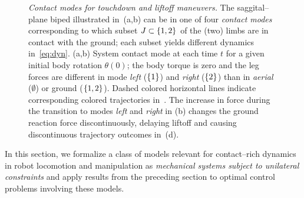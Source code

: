 \documentclass{article}
\begin{document}
\begin{figure}

\centering
{}

\caption{\label{fig:contact}
\emph{Contact modes for touchdown and liftoff maneuvers.}
The saggital--plane biped illustrated in~(a,b) can be in one of four \emph{contact modes} corresponding to which subset $J\subset\left\{ 1,2 \right\}$ of the (two) limbs are in contact with the ground; each subset yields different dynamics in~\eqref{eq:dyn}.
(a,b) System contact mode 
at each time $t$ 
for a given initial body rotation $\theta(0)$;
the body torque is zero and the leg forces are different in mode \emph{left} ($\left\{ 1 \right\}$) and \emph{right} ($\left\{ 2 \right\}$) than in \emph{aerial} ($\emptyset$) or ground ($\left\{ 1,2 \right\}$).
Dashed colored horizontal lines indicate corresponding colored trajectories in~.
The increase in force 
during the transition to modes \emph{left} and \emph{right}
in (b) 
changes the ground reaction force discontinuously, delaying liftoff %
and causing
discontinuous trajectory outcomes in~(d).
%
}
\end{figure}

In this section, we formalize a class of models relevant for contact--rich dynamics in robot locomotion and manipulation as \emph{mechanical systems subject to unilateral constraints} and apply results from the preceding section to optimal control problems involving these models.
\end{document}
